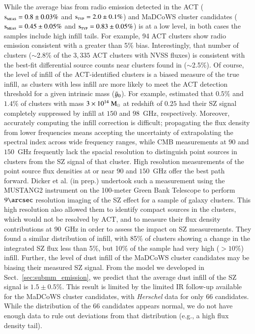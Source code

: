 \documentclass[longauth]{aa} %
\newcommand{\madcows}{MaDCoWS\xspace}
\newcommand{\yc}{$\Tilde{\vary}_0$\xspace}
\begin{document}
While the average bias from radio emission detected in the ACT ($\textsc{s}_{\textsc{meas}} = 0.8\pm 0.03\%$ and $\textsc{s}_{\textsc{typ}}= 2.0\pm0.1\%$) and \madcows cluster candidates ($\textsc{s}_{\textsc{meas}} =0.45 \pm 0.05 \%$ and $\textsc{s}_{\textsc{typ}}= 0.83\pm0.05\%$) is at a low level, in both cases the samples include high infill tails. For example, 94 ACT clusters show radio emission consistent with a greater than 5\% bias. Interestingly, that number of clusters ($\sim$2.8\% of the $3,335$ ACT clusters with NVSS fluxes) is consistent with the best-fit differential source counts near clusters found in \citet{Coble2007} ($\sim$2.5\%). Of course, the level of infill of the ACT-identified clusters is a biased measure of the true infill, as clusters with less infill are more likely to meet the ACT detection threshold for a given intrinsic mass (\yc). For example, \citet{Gupta2017} estimated that $0.5\%$ and $1.4\%$ of clusters with mass $3\times 10^{14}~\rm M_\odot$ at redshift of $0.25$ had their SZ signal completely suppressed by infill at $150$ and $98$~GHz, respectively. Moreover, accurately computing the infill correction is difficult; propagating the flux density  from lower frequencies means accepting the uncertainty of extrapolating the spectral index across wide frequency ranges, while CMB measurements at $90$ and $150$~GHz frequently lack the spacial resolution to distinguish point sources in clusters from the SZ signal of that cluster. High resolution measurements of the point source flux densities at or near $90$ and $150$~GHz offer the best path forward. Dicker et al. (in prep.) undertook such a measurement using the MUSTANG2 instrument \citep{Dicker2014} on the 100-meter Green Bank Telescope to perform $9\arcsec$ resolution imaging of the SZ effect for a sample of galaxy clusters. This high resolution also allowed them to identify compact sources in the clusters, which would not be resolved by ACT, and to measure their flux density contributions at 90~GHz in order to assess the impact on SZ measurements. They found a similar distribution of infill, with 85\% of clusters showing a change in the  integrated SZ flux less than 5\%, but 10\% of the sample had very high ($>10\%$) infill.
Further, the level of dust infill of the \madcows cluster candidates may be biasing their measured SZ signal. From the model we developed in Sect.~\ref{sec:submm_emission}, we predict that the average dust infill of the SZ signal is $1.5\pm 0.5\%$. This result is limited by the limited IR follow-up available for the \madcows cluster candidates, with {\it Herschel} data for only 66 candidates. While the distribution of the 66 candidates appears normal, we do not have enough data to rule out deviations from that distribution (e.g., a high flux density tail).
\end{document}
